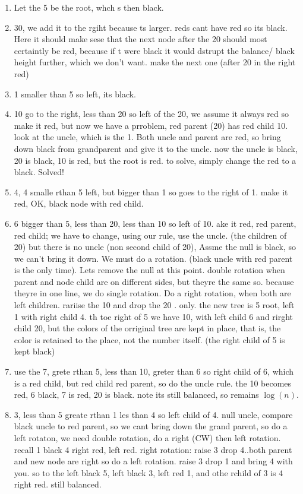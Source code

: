 \documentclass[]{article}
\begin{document}
\begin{enumerate}
\item{Let the 5 be the root, whch s then black.}
\item{30, we add it to the rgiht because ts larger. reds cant have red so its black. Here it should make sese that the next node after the 20 should most certaintly be red, because if t were black it would dstrupt the balance/ black height further, which we don't want. make the next one (after 20 in the right red)}
\item{1 smaller than 5 so left, its black.}
\item{10 go to the right, less than 20 so left of the 20, we assume it always red so make it red, but now we have a prroblem, red parent (20) has red child 10. look at the uncle, which is the 1. Both uncle and parent are red, so bring down black from grandparent and give it to the uncle. now the uncle is black, 20 is black, 10 is red, but the root is red. to solve, simply change the red to a black. Solved!}
\item{4, 4 smalle rthan 5 left, but bigger than 1 so goes to the right of 1. make it red, OK, black node with red child.}
\item{6 bigger than 5, less than 20, less than 10 so left of 10. ake it red, red parent, red child; we have to change, using our rule, use the uncle. (the children of 20) but there is no uncle (non second child of 20), Assme the null is black, so we can't bring it down. We must do a rotation. (black uncle with red parent is the only time). Lets remove the null at this point. double rotation when parent and node child are on different sides, but theyre the same so. because theyre in one line, we do single rotation. Do a right rotation, when both are left children. rariise the 10 and drop the 20 . only. the new tree is 5 root, left 1 with right child 4. th toe right of 5 we have 10, with left child 6 and rirght child  20, but the colors of the orriginal tree are kept in place, that is, the color is retained to the place, not the number itself. (the right child of 5 is kept black)}
\item{ use the 7, grete rthan 5, less than 10, greter than 6 so right child of 6, which is a red child, but red child red parent, so do the uncle rule. the 10 becomes red, 6 black, 7 is red, 20 is black. note its still balanced, so remains $\log (n)$. }
\item{3, less than 5 greate rthan 1 les than 4 so left child of 4. null uncle, compare black uncle to red parent, so we cant bring down the grand parent, so do a left rotaton,   we need double rotation, do a right (CW) then left rotation. recall 1 black 4 right red, left red. right rotation: raise 3 drop 4..both parent and new node are right so do a left rotation. raise 3 drop 1 and bring 4 with you. so to the left black 5, left black 3, left red 1, and othe rchild of 3 is 4 right red.  still balanced. }

\end{enumerate}
\end{document}

